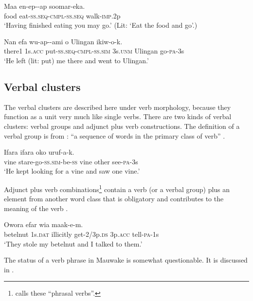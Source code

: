 \ea%
\label{ex:3:x343}
\gll Maa en-ep--ap soomar-eka. \\
food eat-\textsc{ss}.\textsc{seq}-\textsc{cmpl}-\textsc{ss}.\textsc{seq} walk-\textsc{imp}.2p \\
\glt`Having finished eating you may go.' (Lit: `Eat the food and go'.)
\z

\ea%
\label{ex:3:x501}
\gll Nan efa wu-ap--ami o Ulingan ikiw-o-k. \\
there1 1s.\textsc{acc} put-\textsc{ss}.\textsc{seq}-\textsc{cmpl}-\textsc{ss}.\textsc{sim} 3s.\textsc{unm} Ulingan go-\textsc{pa}-3s\\
\glt`He left (lit: put) me there and went to Ulingan.'
\z

\subsection{Verbal clusters}\label{sec:3.8.5}
{}
The verbal clusters are described here under verb morphology, because they function as a unit very much like single verbs. There are two kinds of verbal clusters: verbal groups and adjunct plus verb constructions. The definition of a verbal group is from \citet[175]{Halliday1994}: ``a sequence of words in the primary class of verb'' . 

\ea%
\label{ex:3:x347}
\gll Ifara  ifara oko uruf-a-k. \\
vine stare-go-\textsc{ss}.\textsc{sim}-be-\textsc{ss}  vine other see-\textsc{pa}-3s\\
\glt`He kept looking for a vine and saw one vine.'
\z

Adjunct plus verb combinations\footnote{\citet[184]{Halliday1994} calls these ``phrasal verbs''.} contain a verb (or a verbal group) plus an element from another word class that is obligatory and contributes to the meaning of the verb . 

\ea%
\label{ex:3:x348}
\gll Owora efar   wia maak-e-m. \\
betelnut 1s.\textsc{dat} illicitly get-2/3p.\textsc{ds} 3p.\textsc{acc} tell-\textsc{pa}-1s\\
\glt`They stole my betelnut and I talked to them.'
\z

The status of a verb phrase in Mauwake is somewhat questionable. It is discussed in . 

